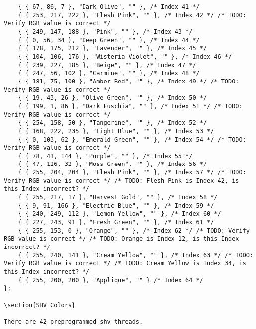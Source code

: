 \documentclass[onesize, a4paper]{refart}
\begin{document}
\begin{verbatim}
    { { 67, 86, 7 }, "Dark Olive", "" }, /* Index 41 */
    { { 253, 217, 222 }, "Flesh Pink", "" }, /* Index 42 */ /* TODO: Verify RGB value is correct */
    { { 249, 147, 188 }, "Pink", "" }, /* Index 43 */
    { { 0, 56, 34 }, "Deep Green", "" }, /* Index 44 */
    { { 178, 175, 212 }, "Lavender", "" }, /* Index 45 */
    { { 104, 106, 176 }, "Wisteria Violet", "" }, /* Index 46 */
    { { 239, 227, 185 }, "Beige", "" }, /* Index 47 */
    { { 247, 56, 102 }, "Carmine", "" }, /* Index 48 */
    { { 181, 75, 100 }, "Amber Red", "" }, /* Index 49 */ /* TODO: Verify RGB value is correct */
    { { 19, 43, 26 }, "Olive Green", "" }, /* Index 50 */
    { { 199, 1, 86 }, "Dark Fuschia", "" }, /* Index 51 */ /* TODO: Verify RGB value is correct */
    { { 254, 158, 50 }, "Tangerine", "" }, /* Index 52 */
    { { 168, 222, 235 }, "Light Blue", "" }, /* Index 53 */
    { { 0, 103, 62 }, "Emerald Green", "" }, /* Index 54 */ /* TODO: Verify RGB value is correct */
    { { 78, 41, 144 }, "Purple", "" }, /* Index 55 */
    { { 47, 126, 32 }, "Moss Green", "" }, /* Index 56 */
    { { 255, 204, 204 }, "Flesh Pink", "" }, /* Index 57 */ /* TODO: Verify RGB value is correct */ /* TODO: Flesh Pink is Index 42, is this Index incorrect? */
    { { 255, 217, 17 }, "Harvest Gold", "" }, /* Index 58 */
    { { 9, 91, 166 }, "Electric Blue", "" }, /* Index 59 */
    { { 240, 249, 112 }, "Lemon Yellow", "" }, /* Index 60 */
    { { 227, 243, 91 }, "Fresh Green", "" }, /* Index 61 */
    { { 255, 153, 0 }, "Orange", "" }, /* Index 62 */ /* TODO: Verify RGB value is correct */ /* TODO: Orange is Index 12, is this Index incorrect? */
    { { 255, 240, 141 }, "Cream Yellow", "" }, /* Index 63 */ /* TODO: Verify RGB value is correct */ /* TODO: Cream Yellow is Index 34, is this Index incorrect? */
    { { 255, 200, 200 }, "Applique", "" } /* Index 64 */
};

\section{SHV Colors}

There are 42 preprogrammed shv threads.


\end{verbatim}
\end{document}
